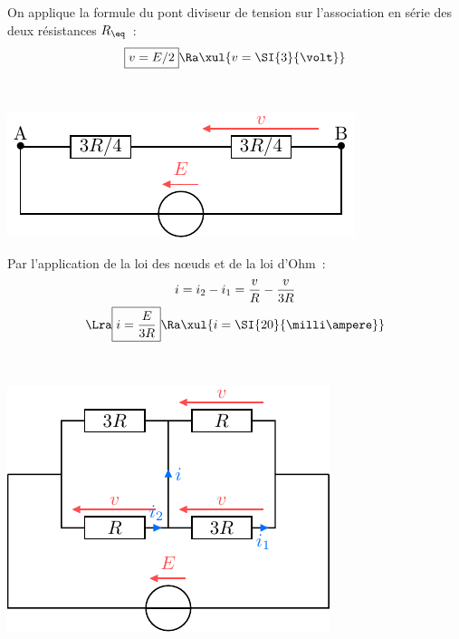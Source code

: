 \documentclass[a4paper, 10pt, garamond, oneside]{book}
\begin{document}
{\begin{enumerate}
\begin{minipage}[t]{0.55\linewidth}
			On applique la formule du pont diviseur de tension sur l'association
			en série des deux résistances $R_{\eq}$~:
			\[
				\boxed{v = E/2}
				\Ra
				\xul{v=\SI{3}{\volt}}
			\]
		\end{minipage}
		\hfill
		\begin{minipage}[t]{0.4\linewidth}
			~
			\vspace{-30pt}
			\begin{center}
				\includegraphics[width=\linewidth]{diplin_q4}
			\end{center}
		\end{minipage}
		\vspace{30pt}
		 \noindent
		\begin{minipage}[t]{0.55\linewidth}
			Par l'application de la loi des nœuds et de la loi d'Ohm~:
			\begin{gather*}
				i=i_2-i_1=\frac{v}{R}-\frac{v}{3R}
				\\\Lra
				\boxed{i = \frac{E}{3R}}
				\Ra
				\xul{i = \SI{20}{\milli\ampere}}
			\end{gather*}
		\end{minipage}
		\hfill
		\begin{minipage}[t]{0.4\linewidth}
			~
			\vspace{-60pt}
			\begin{center}
				\includegraphics[width=\linewidth]{diplin_q5}
			\end{center}
		\end{minipage}
	\end{enumerate}
}
\end{document}
